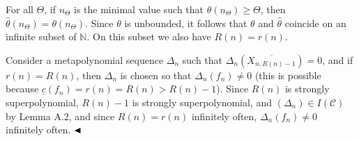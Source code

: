 For all $\Theta$, if $n_{\Theta}$ is the minimal value such that $\theta(n_{\Theta})\geq\Theta$, then $\hat{\theta}(n_{\Theta})=\theta(n_{\Theta})$.
Since $\theta$ is unbounded, it follows that $\theta$ and $\hat{\theta}$ coincide on an infinite subset of $\mathbb{N}$.
On this subset we also have $R(n)=r(n)$.





Consider a metapolynomial sequence $\Delta_{n}$ such that $\Delta_{n}(\overline{X_{n,R(n)-1}})=0$, and if $r(n)=R(n)$, then $\Delta_{n}$ is chosen so that $\Delta_{n}(f_{n})\neq 0$ (this is possible because $\underline{c}(f_{n})=r(n)=R(n)>R(n)-1$).
Since $R(n)$ is strongly superpolynomial, $R(n)-1$ is strongly superpolynomial, and $(\Delta_{n})\in I(\mathcal{C})$ by Lemma A.2, and since $R(n)=r(n)$ infinitely often, $\Delta_{n}(f_{n})\neq 0$ infinitely often.
$\hfill\blacktriangleleft$




